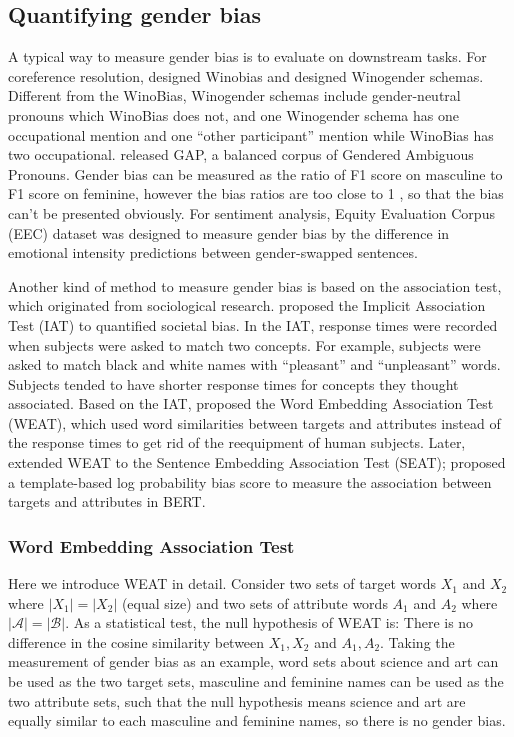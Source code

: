 \subsection{Quantifying gender bias}
A typical way to measure gender bias is to evaluate on downstream tasks. For coreference resolution, \citet{zhao2018gender} designed Winobias and \citet{rudinger2018gender} designed Winogender schemas. Different from the WinoBias, Winogender schemas include gender-neutral pronouns which WinoBias does not, and one Winogender schema has one occupational mention and one “other participant” mention while WinoBias has two occupational. \citet{webster2018mind} released GAP, a balanced corpus of Gendered Ambiguous Pronouns. Gender bias can be measured as the ratio of F1 score on masculine to F1 score on feminine, however the bias ratios are too close to 1 \citep{Chada_2019, Attree_2019}, so that the bias can't be presented obviously. For sentiment analysis, Equity Evaluation Corpus (EEC) dataset \citep{Kiritchenko_2018} was designed to measure gender bias by the difference in emotional intensity predictions between gender-swapped sentences.

Another kind of method to measure gender bias is based on the association test, which originated from sociological research. \citet{greenwald1998measuring} proposed the Implicit Association Test (IAT) to quantified societal bias. In the IAT, response times were recorded when subjects were asked to match two concepts. For example, subjects were asked to match black and white names with “pleasant” and “unpleasant” words. Subjects tended to have shorter response times for concepts they thought associated. Based on the IAT, \citet{caliskan2017semantics} proposed the Word Embedding Association Test (WEAT), which used word similarities between targets and attributes instead of the response times to get rid of the reequipment of human subjects. Later, \citet{may2019measuring} extended WEAT to the Sentence Embedding Association Test (SEAT); \citet{kurita2019measuring} proposed a template-based log probability bias score to measure the association between targets and attributes in BERT.

\subsubsection{Word Embedding Association Test}
Here we introduce WEAT in detail. Consider two sets of target words $X_1$ and $X_2$ where $|X_1|=|X_2|$ (equal size) and two sets of attribute words $A_1$ and $A_2$ where $|\mathcal{A}|=|\mathcal{B}|$. As a statistical test, the null hypothesis of WEAT is: There is no difference in the cosine similarity between $X_1,X_2$ and $
A_1,A_2$. Taking the measurement of gender bias as an example, word sets about science and art can be used as the two target sets, masculine and feminine names can be used as the two attribute sets, such that the null hypothesis means science and art are equally similar to each masculine and feminine names, so there is no gender bias.

